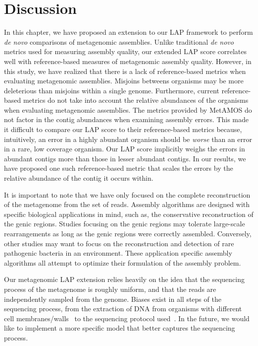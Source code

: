 \documentclass[12pt,\mydriver]{thesis}
\begin{document}
\section{Discussion}

In this chapter, we have proposed an extension to our LAP framework to perform \emph{de novo} comparisons of metagenomic assemblies.
Unlike traditional \emph{de novo} metrics used for measuring assembly quality, our extended LAP score correlates well with reference-based measures of metagenomic assembly quality.
However, in this study, we have realized that there is a lack of reference-based metrics when evaluating metagenomic assemblies.
Misjoins betweens organisms may be more deleterious than misjoins within a single genome.
Furthermore, current reference-based metrics do not take into account the relative abundances of the organisms when evaluating metagenomic assemblies.
The metrics provided by MetAMOS do not factor in the contig abundances when examining assembly errors.
This made it difficult to compare our LAP score to their reference-based metrics because, intuitively, an error in a highly abundant organism should be \emph{worse} than an error in a rare, low coverage organism.
Our LAP score implicitly weighs the errors in abundant contigs more than those in lesser abundant contigs.
In our results, we have proposed one such reference-based metric that scales the errors by the relative abundance of the contig it occurs within.

It is important to note that we have only focused on the complete reconstruction of the metagenome from the set of reads.
Assembly algorithms are designed with specific biological applications in mind, such as, the conservative reconstruction of the genic regions.
Studies focusing on the genic regions may tolerate large-scale rearrangements as long as the genic regions were correctly assembled.
Conversely, other studies may want to focus on the reconstruction and detection of rare pathogenic bacteria in an environment.
These application specific assembly algorithms all attempt to optimize their formulation of the assembly problem.

Our metagenomic LAP extension relies heavily on the idea that the sequencing process of the metagenome is roughly uniform, and that the reads are independently sampled from the genome.
Biases exist in all steps of the sequencing process, from the extraction of DNA from organisms with different cell membranes/walls~\cite{carrigg2007dna,krsek1999comparison} to the sequencing protocol used~\cite{morgan2010metagenomic,temperton2009bias}.
In the future, we would like to implement a more specific model that better captures the sequencing process.
\end{document}
